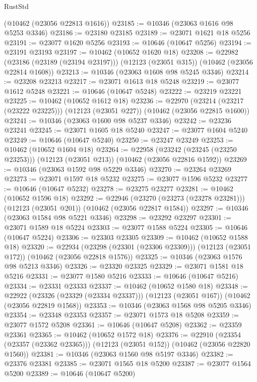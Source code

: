 \begin{lexlean}{RustStd}
\begin{coremodule}
    (@10462 (@23056 @22813 @1616))
@23185 := @10346 (@23063 @1616 @98 @5253 @3346)
@23186 := @23180 @23185
@23189 := @23071 @1621 @18 @5256
@23191 := @23077 @1620 @5256
@23193 := @10646 (@10647 @5256)
@23194 := @23191 @23193
@23197 := @10462 (@10652 @1620 @18)
@23208 := @22982
    (@23186 (@23189 (@23194 @23197)))
    (@12123 (@23051 @315))
    (@10462 (@23056 @22814 @1608))
@23213 := @10346 (@23063 @1608 @98 @5245 @3346)
@23214 := @23208 @23213
@23217 := @23071 @1613 @18 @5248
@23219 := @23077 @1612 @5248
@23221 := @10646 (@10647 @5248)
@23222 := @23219 @23221
@23225 := @10462 (@10652 @1612 @18)
@23236 := @22970
    (@23214 (@23217 (@23222 @23225)))
    (@12123 (@23051 @227))
    (@10462 (@23056 @22815 @1600))
@23241 := @10346 (@23063 @1600 @98 @5237 @3346)
@23242 := @23236 @23241
@23245 := @23071 @1605 @18 @5240
@23247 := @23077 @1604 @5240
@23249 := @10646 (@10647 @5240)
@23250 := @23247 @23249
@23253 := @10462 (@10652 @1604 @18)
@23264 := @22958
    (@23242 (@23245 (@23250 @23253)))
    (@12123 (@23051 @213))
    (@10462 (@23056 @22816 @1592))
@23269 := @10346 (@23063 @1592 @98 @5229 @3346)
@23270 := @23264 @23269
@23273 := @23071 @1597 @18 @5232
@23275 := @23077 @1596 @5232
@23277 := @10646 (@10647 @5232)
@23278 := @23275 @23277
@23281 := @10462 (@10652 @1596 @18)
@23292 := @22946
    (@23270 (@23273 (@23278 @23281)))
    (@12123 (@23051 @201))
    (@10462 (@23056 @22817 @1584))
@23297 := @10346 (@23063 @1584 @98 @5221 @3346)
@23298 := @23292 @23297
@23301 := @23071 @1589 @18 @5224
@23303 := @23077 @1588 @5224
@23305 := @10646 (@10647 @5224)
@23306 := @23303 @23305
@23309 := @10462 (@10652 @1588 @18)
@23320 := @22934
    (@23298 (@23301 (@23306 @23309)))
    (@12123 (@23051 @172))
    (@10462 (@23056 @22818 @1576))
@23325 := @10346 (@23063 @1576 @98 @5213 @3346)
@23326 := @23320 @23325
@23329 := @23071 @1581 @18 @5216
@23331 := @23077 @1580 @5216
@23333 := @10646 (@10647 @5216)
@23334 := @23331 @23333
@23337 := @10462 (@10652 @1580 @18)
@23348 := @22922
    (@23326 (@23329 (@23334 @23337)))
    (@12123 (@23051 @167))
    (@10462 (@23056 @22819 @1568))
@23353 := @10346 (@23063 @1568 @98 @5205 @3346)
@23354 := @23348 @23353
@23357 := @23071 @1573 @18 @5208
@23359 := @23077 @1572 @5208
@23361 := @10646 (@10647 @5208)
@23362 := @23359 @23361
@23365 := @10462 (@10652 @1572 @18)
@23376 := @22910
    (@23354 (@23357 (@23362 @23365)))
    (@12123 (@23051 @152))
    (@10462 (@23056 @22820 @1560))
@23381 := @10346 (@23063 @1560 @98 @5197 @3346)
@23382 := @23376 @23381
@23385 := @23071 @1565 @18 @5200
@23387 := @23077 @1564 @5200
@23389 := @10646 (@10647 @5200)

\end{coremodule}
\end{lexlean}
